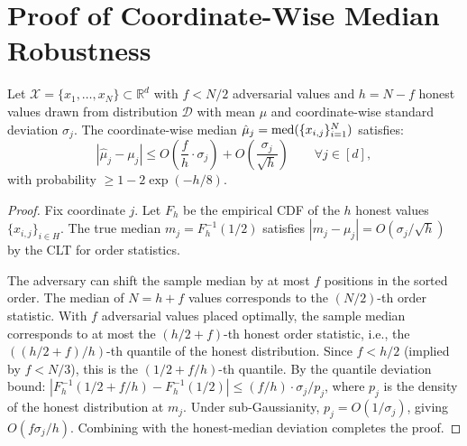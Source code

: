 \section{Proof of Coordinate-Wise Median Robustness}

\label{app:cwmed-proof}

\begin{theorem}
\label{thm:cwmed-robust-full}
Let $\mathcal{X} = \{x_1, \ldots, x_N\} \subset \mathbb{R}^d$ with $f < N/2$
adversarial values and $h = N - f$ honest values drawn from distribution
$\mathcal{D}$ with mean $\mu$ and coordinate-wise standard deviation $\sigma_j$.
The coordinate-wise median $\hat{\mu}_j = \operatorname{med}(\{x_{i,j}\}_{i=1}^N)$ satisfies:
\begin{equation}
    |\hat{\mu}_j - \mu_j| \leq O\!\left(\frac{f}{h} \cdot \sigma_j\right)
    + O\!\left(\frac{\sigma_j}{\sqrt{h}}\right)
    \qquad \forall j \in [d],
\end{equation}
with probability $\geq 1 - 2\exp(-h/8)$.
\end{theorem}

\begin{proof}
Fix coordinate $j$. Let $F_h$ be the empirical CDF of the $h$ honest values
$\{x_{i,j}\}_{i \in H}$. The true median $m_j = F_h^{-1}(1/2)$ satisfies
$|m_j - \mu_j| = O(\sigma_j / \sqrt{h})$ by the CLT for order statistics.

The adversary can shift the sample median by at most $f$ positions in the
sorted order. The median of $N = h + f$ values corresponds to the
$(N/2)$-th order statistic. With $f$ adversarial values placed optimally,
the sample median corresponds to at most the $(h/2 + f)$-th honest order
statistic, i.e., the $((h/2 + f)/h)$-th quantile of the honest distribution.
Since $f < h/2$ (implied by $f < N/3$), this is the $(1/2 + f/h)$-th quantile.
By the quantile deviation bound:
$|F_h^{-1}(1/2 + f/h) - F_h^{-1}(1/2)| \leq (f/h) \cdot \sigma_j / p_j$,
where $p_j$ is the density of the honest distribution at $m_j$. Under
sub-Gaussianity, $p_j = O(1/\sigma_j)$, giving $O(f \sigma_j / h)$.
Combining with the honest-median deviation completes the proof.
\end{proof}

